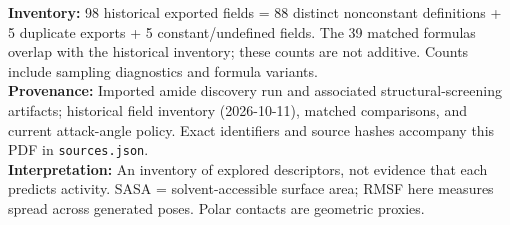 \documentclass[11pt]{article}
\begin{document}
\vspace{6pt}
{\fontsize{9}{10.5}\selectfont\color{muted}
\textbf{Inventory:} 98 historical exported fields = 88 distinct nonconstant definitions + 5 duplicate exports + 5 constant/undefined fields.
The 39 matched formulas overlap with the historical inventory; these counts are not additive. Counts include sampling diagnostics and formula variants.\\
\textbf{Provenance:} Imported amide discovery run and associated structural-screening artifacts; historical field inventory (2026-10-11), matched comparisons, and current attack-angle policy. Exact identifiers and source hashes accompany this PDF in \texttt{sources.json}.\\
\textbf{Interpretation:} An inventory of explored descriptors, not evidence that each predicts activity. SASA = solvent-accessible surface area; RMSF here measures spread across generated poses. Polar contacts are geometric proxies.}
\end{document}
